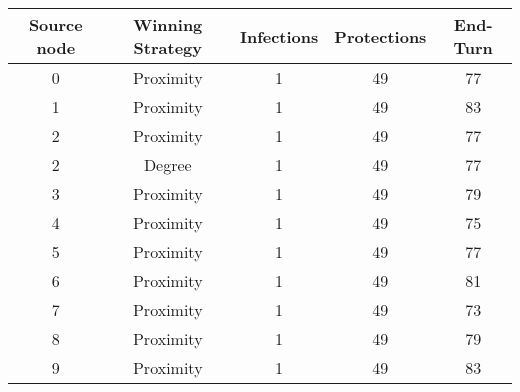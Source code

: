 \documentclass[results.tex]{subfiles}
\begin{document}
    \begin{center}
        \begin{tabular}{| c || c | c | c | c |}
            \hline
            {\bfseries Source node} & {\bfseries Winning Strategy} & {\bfseries Infections} & {\bfseries Protections}
            & {\bfseries End-Turn}
            \\  %
            \hline\hline
            0                       & Proximity                    & 1                      & 49                      & 77                   \\
            \hline
            1                       & Proximity                    & 1                      & 49                      & 83                   \\
            \hline
            2                       & Proximity                    & 1                      & 49                      & 77                   \\
            \hline
            2                       & Degree                       & 1                      & 49                      & 77                   \\
            \hline
            3                       & Proximity                    & 1                      & 49                      & 79                   \\
            \hline
            4                       & Proximity                    & 1                      & 49                      & 75                   \\
            \hline
            5                       & Proximity                    & 1                      & 49                      & 77                   \\
            \hline
            6                       & Proximity                    & 1                      & 49                      & 81                   \\
            \hline
            7                       & Proximity                    & 1                      & 49                      & 73                   \\
            \hline
            8                       & Proximity                    & 1                      & 49                      & 79                   \\
            \hline
            9                       & Proximity                    & 1                      & 49                      & 83                   \\

\end{tabular}
\end{center}
\end{document}
